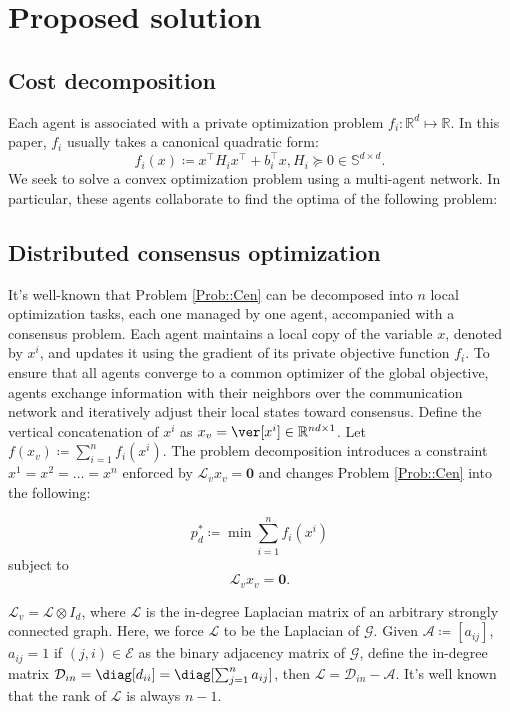 \section{Proposed solution}
\subsection{Cost decomposition}
Each agent is associated with a private optimization problem \(f_i\colon \mathbb{R}^d \mapsto \mathbb{R}\). In this paper, \(f_i\) usually takes a canonical quadratic form:
\[
f_i(x) \coloneqq x^\top H_i x^\top + b_i^\top x, H_i \succeq 0\in\mathbb{S}^{d\times d}.
\]
We seek to solve a convex optimization problem using a multi-agent network. In particular, these agents collaborate to find the optima of the following problem:
\begin{opt}\label{Prob::Cen}

\end{opt}

\subsection{Distributed consensus optimization}
It's well-known that Problem \ref{Prob::Cen} can be decomposed into \(n\) local optimization tasks, each one managed by one agent, accompanied with a consensus problem. Each agent maintains a local copy of the variable \(x\), denoted by \(x^i\), and updates it using the gradient of its private objective function \(f_i\). To ensure that all agents converge to a common optimizer of the global objective, agents exchange information with their neighbors over the communication network and iteratively adjust their local states toward consensus. Define the vertical concatenation of \(x^i\) as \(x_v =\ver[x^i] \in \mathbb{R}^{nd\times 1}\). Let \(f(x_v)\coloneqq \sum_{i = 1}^n f_i(x^i)\). The problem decomposition introduces a constraint \(x^1 = x^2 = \hdots = x^n\) enforced by \(\mathcal{L}_v x_v = \mathbf{0}\) and changes Problem \ref{Prob::Cen} into the following:
\begin{opt}\label{Prob::Dis}
\begin{equation}
    p_d^* \coloneqq \min \sum_{i = 1}^n f_i(x^i)
\end{equation}
subject to
\[
\mathcal{L}_v x_v = \mathbf{0}.
\]
\end{opt}
\(\mathcal{L}_v = \mathcal{L} \otimes I_d\), where \( \mathcal{L}\) is the in-degree Laplacian matrix of an arbitrary strongly connected graph. Here, we force \( \mathcal{L}\) to be the Laplacian of \(\mathcal{G}\). Given \(\mathcal{A} \coloneqq [a_{ij}]\), \(a_{ij} = 1\) if \((j,i) \in \mathcal{E}\) as the binary adjacency matrix of \(\mathcal{G}\), define the in-degree matrix \(\mathcal{D}_{in} = \diag[d_{ii}] = \diag[\sum_{j = 1}^n a_{ij}]\), then \(\mathcal{L} = \mathcal{D}_{in} - \mathcal{A}\).
It's well known that the rank of \(\mathcal{L}\) is always \(n - 1\).

